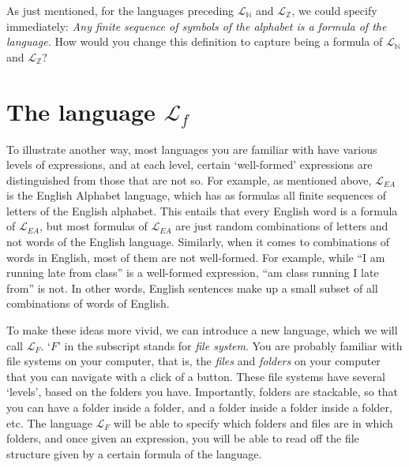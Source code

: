 \begin{exc}
As just mentioned, for the languages preceding $\mathcal{L}_\mathbb{N}$ and $\mathcal{L}_\mathbb{Z}$, we could specify immediately: \textit{Any finite sequence of symbols of the alphabet is a formula of the language.} How would you change this definition to capture being a formula of $\mathcal{L}_\mathbb{N}$ and $\mathcal{L}_\mathbb{Z}$? 
\end{exc}

\section{The language $\mathcal{L}_f$}

To illustrate another way, most languages you are familiar with have various levels of expressions, and at each level, certain `well-formed' expressions are distinguished from those that are not so. For example, as mentioned above, $\mathcal{L}_{EA}$ is the English Alphabet language, which has as formulas all finite sequences of letters of the English alphabet. This entails that every English word is a formula of $\mathcal{L}_{EA}$, but most formulas of $\mathcal{L}_{EA}$ are just random combinations of letters and not words of the English language. Similarly, when it comes to combinations of words in English, most of them are not well-formed. For example, while ``I am running late from class'' is a well-formed expression, ``am class running I late from'' is not. In other words, English sentences make up a small subset of all combinations of words of English. 

To make these ideas more vivid, we can introduce a new language, which we will call $\mathcal{L}_F$. `$F$' in the subscript stands for \textit{file system}. You are probably familiar with file systems on your computer, that is, the \textit{files} and \textit{folders} on your computer that you can navigate with a click of a button. These file systems have several `levels', based on the folders you have. Importantly, folders are stackable, so that you can have a folder inside a folder, and a folder inside a folder inside a folder, etc. The language $\mathcal{L}_F$ will be able to specify which folders and files are in which folders, and once given an expression, you will be able to read off the file structure given by a certain formula of the language. 



